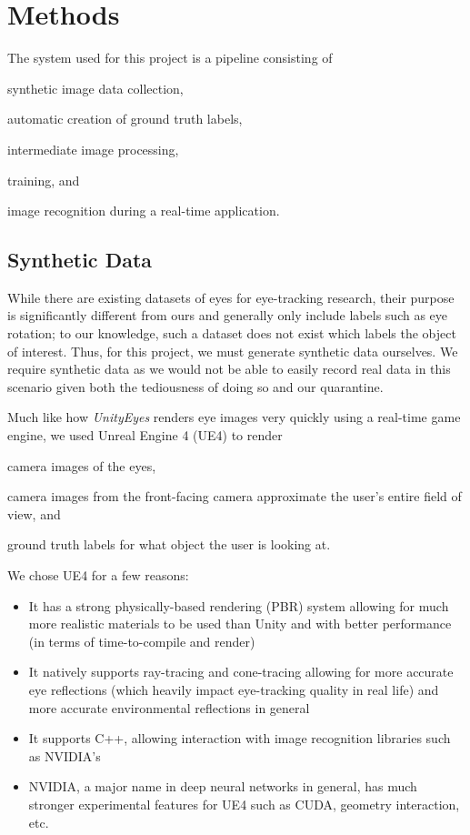 \section{Methods}

The system used for this project is a pipeline consisting of
\begin{inlist}
\item synthetic image data collection,
\item automatic creation of ground truth labels,
\item intermediate image processing,
\item training, and
\item image recognition during a real-time application.
\end{inlist}

\subsection{Synthetic Data}\label{S:synthetic-generation}

While there are existing datasets of eyes for eye-tracking research, their
purpose is significantly different from ours and generally only include labels
such as eye rotation; to our knowledge, such a dataset does not exist which
labels the object of interest. Thus, for this project, we must generate
synthetic data ourselves. We require synthetic data as we would not be able to
easily record real data in this scenario given both the tediousness of doing so
and our quarantine.

Much like how \emph{UnityEyes} renders eye images very quickly using a
real-time game engine, we used Unreal Engine 4 (UE4) to render
\begin{inlist}
\item camera images of the eyes,
\item
    camera images from the front-facing camera approximate the user's entire
    field of view, and
\item ground truth labels for what object the user is looking at.
\end{inlist}
We chose UE4 for a few reasons:

\begin{itemize}
    \item
        It has a strong physically-based rendering (PBR) system allowing for
        much more realistic materials to be used than Unity and with better
        performance (in terms of time-to-compile and render)
    \item
        It natively supports ray-tracing and cone-tracing allowing for more
        accurate eye reflections (which heavily impact eye-tracking quality in
        real life) and more accurate environmental reflections in general
    \item
        It supports C++, allowing interaction with image recognition libraries
        such as NVIDIA's
    \item
        NVIDIA, a major name in deep neural networks in general, has much
        stronger experimental features for UE4 such as CUDA, geometry
        interaction, etc.
\end{itemize}

